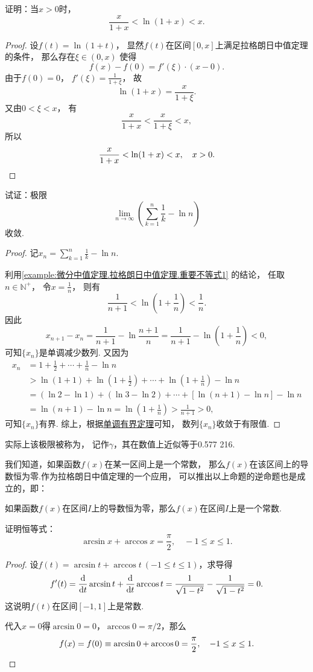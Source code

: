 \begin{example}\label{example:微分中值定理.拉格朗日中值定理.重要不等式1}
证明：当\(x>0\)时，\[
	\frac{x}{1+x} < \ln(1+x) < x.
\]
\begin{proof}
设\(f(t) = \ln(1+t)\)，
显然\(f(t)\)在区间\([0,x]\)上满足拉格朗日中值定理的条件，
那么存在\(\xi\in(0,x)\)
使得\[
	f(x)-f(0)=f'(\xi)\cdot(x-0).
\]
由于\(f(0)=0\)，
\(f'(\xi)=\frac{1}{1+\xi}\)，
故\[
	\ln(1+x) = \frac{x}{1+\xi}.
\]
又由\(0<\xi<x\)，
有\[
	\frac{x}{1+x}<\frac{x}{1+\xi}<x,
\]
所以\[
	\frac{x}{1+x}<\ln(1+x)<x, \quad x > 0.
	\qedhere
\]
\end{proof}
\end{example}

\begin{example}
试证：极限\[
	\lim_{n\to\infty} \left(\sum_{k=1}^n \frac{1}{k} - \ln n\right)
\]收敛.
\begin{proof}
记\(x_n = \sum_{k=1}^n \frac{1}{k} - \ln n\).

利用\cref{example:微分中值定理.拉格朗日中值定理.重要不等式1} 的结论，
任取\(n\in\mathbb{N}^+\)，
令\(x=\frac{1}{n}\)，
则有\[
	\frac{1}{n+1} < \ln(1+\frac{1}{n}) < \frac{1}{n}.
\]
因此\[
	x_{n+1} - x_n = \frac{1}{n+1} - \ln\frac{n+1}{n}
	= \frac{1}{n+1} - \ln(1+\frac{1}{n}) < 0,
\]
可知\(\{x_n\}\)是单调减少数列.
又因为\begin{align*}
	x_n &= 1 + \frac{1}{2} + \dotsb + \frac{1}{n} - \ln n \\
	&> \ln(1+1) + \ln(1+\frac{1}{2}) + \dotsb + \ln(1+\frac{1}{n}) - \ln n \\
	&= (\ln2-\ln1)+(\ln3-\ln2)+\dotsb+[\ln(n+1)-\ln n] - \ln n \\
	&= \ln(n+1) - \ln n
	= \ln(1+\frac{1}{n})
	> \frac{1}{n+1} > 0,
\end{align*}
可知\(\{x_n\}\)有界.
综上，根据\hyperref[theorem:极限.函数的单调有界定理]{单调有界定理}可知，
数列\(\{x_n\}\)收敛于有限值.
\end{proof}
实际上该极限被称为，
记作\(\gamma\)，其在数值上近似等于0.577 216.
\end{example}

我们知道，如果函数\(f(x)\)在某一区间上是一个常数，
那么\(f(x)\)在该区间上的导数恒为零.作为拉格朗日中值定理的一个应用，
可以推出以上命题的逆命题也是成立的，即：
\begin{theorem}
如果函数\(f(x)\)在区间\(I\)上的导数恒为零，那么\(f(x)\)在区间\(I\)上是一个常数.
\end{theorem}

\begin{example}
证明恒等式：\[
\arcsin x + \arccos x = \frac{\pi}{2},
\quad -1 \leq x \leq 1.
\]
\begin{proof}
设\(f(t) = \arcsin t + \arccos t\ (-1 \leq t \leq 1)\)，求导得\[
	f'(t) = \dv{t} \arcsin t + \dv{t} \arccos t
	= \frac{1}{\sqrt{1-t^2}} - \frac{1}{\sqrt{1-t^2}} = 0.
\]
这说明\(f(t)\)在区间\([-1,1]\)上是常数.

代入\(x=0\)得\(\arcsin 0 = 0\)，\(\arccos 0 = \pi/2\)，那么\[
	f(x) = f(0) \equiv \arcsin 0 + \arccos 0 = \frac{\pi}{2},
	\quad -1 \leq x \leq 1.
	\qedhere
\]
\end{proof}
\end{example}

